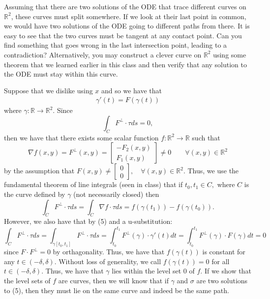 \documentclass[11pt]{article}
\newcommand{\bbR}{\mathbb{R}}
\begin{document}
\begin{problem}
Assuming that there are two solutions of the ODE that trace different curves
on $\bbR^2$, these curves must split somewhere. If we look at their last point in
common, we would have two solutions of the ODE going to different paths from there.
It is easy to see that the two curves must be tangent at any contact point. Can you
find something that goes wrong in the last intersection point, leading to a
contradiction?
Alternatively, you may construct a clever curve on $\bbR^2$ using some theorem that
we learned earlier in this class and then verify that any solution to the ODE must
stay within this curve.
\end{problem}
\begin{solution}
Suppose that we dislike using $x$ and so we have that 
\begin{align}
\gamma'(t) = F(\gamma(t))    
\end{align}
where $\gamma: \bbR \to \bbR^2.$ 
    Since 
    \[\int_C F^\perp \cdot \tau ds = 0,\] then we have that there exists some scalar function $f: \bbR^2 \to \bbR$ such that 
    \[\nabla f(x,y) = F^\perp(x,y) = \begin{bmatrix}
        -F_2(x,y)\\ F_1(x,y)
    \end{bmatrix} \neq 0 \qquad \forall (x,y)\in \bbR^2\] by the assumption that  $F(x,y)\neq \begin{bmatrix}
        0\\0
    \end{bmatrix}, \quad \forall (x,y)\in \bbR^2.$ Thus, we use the fundamental theorem of line integrals (seen in class) that if $t_0,t_1 \in C,$ where $C$ is the curve defined by $\gamma$ (not necessarily closed) then 
    \[\int_C F^\perp \cdot \tau ds = \int_C \nabla f \cdot \tau ds = f(\gamma(t_1)) - f(\gamma(t_0)).\] However, we also have that by (5) and a u-substitution:
    \[\int_C F^\perp \cdot \tau ds = \int_{\gamma[t_0, t_1]} F^\perp \cdot \tau ds = \int_{t_0}^{t_1} F^\perp(\gamma)\cdot \gamma'(t)dt = \int_{t_0}^{t_1} F^\perp(\gamma)\cdot F(\gamma)dt = 0\] since $F\cdot F^\perp = 0$ by orthagonality. Thus, we have that $f(\gamma(t))$ is constant for any $t\in (-\delta, \delta).$ Without loss of generality, we call $f(\gamma(t)) = 0$ for all $t \in (-\delta, \delta).$ Thus, we have that $\gamma$ lies within the level set $0$ of $f.$ If we show that the level sets of $f$ are curves, then we will know that if $\gamma$ and $\sigma$ are two solutions to (5), then they must lie on the same curve and indeed be the same path.\\


\end{solution}
\end{document}
